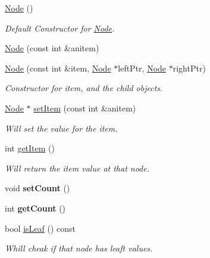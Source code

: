 \begin{DoxyCompactItemize}
\item 
\mbox{\label{class_node_ad7a34779cad45d997bfd6d3d8043c75f}} 
\mbox{\hyperlink{class_node_ad7a34779cad45d997bfd6d3d8043c75f}{Node}} ()
\begin{DoxyCompactList}\small\item\em Default Constructor for \mbox{\hyperlink{class_node}{Node}}. \end{DoxyCompactList}\item 
\mbox{\hyperlink{class_node_a6b85d29b3bde0f983d0a6135ca440c0a}{Node}} (const int \&anitem)
\item 
\mbox{\hyperlink{class_node_a63f4f5083e2a677525a28a5cd194178d}{Node}} (const int \&item, \mbox{\hyperlink{class_node}{Node}} $\ast$left\+Ptr, \mbox{\hyperlink{class_node}{Node}} $\ast$right\+Ptr)
\begin{DoxyCompactList}\small\item\em Constructor for item, and the child objects. \end{DoxyCompactList}\item 
\mbox{\hyperlink{class_node}{Node}} $\ast$ \mbox{\hyperlink{class_node_a2ee7aacc0b20abf2301256fe72d0d9cc}{set\+Item}} (const int \&anitem)
\begin{DoxyCompactList}\small\item\em Will set the value for the item. \end{DoxyCompactList}\item 
int \mbox{\hyperlink{class_node_ad51c74ff8860a12738136be8f1f17682}{get\+Item}} ()
\begin{DoxyCompactList}\small\item\em Will return the item value at that node. \end{DoxyCompactList}\item 
\mbox{\label{class_node_aa4852cb11b6fc5fbb03e110390d0966d}} 
void {\bfseries set\+Count} ()
\item 
\mbox{\label{class_node_a7fa9c0a066de25a23670691f6ca99116}} 
int {\bfseries get\+Count} ()
\item 
bool \mbox{\hyperlink{class_node_a0c5b662d3bfbb856292a9aab878ed622}{is\+Leaf}} () const
\begin{DoxyCompactList}\small\item\em Whill cheak if that node has leaft values. \end{DoxyCompactList}\item 

\end{DoxyCompactItemize}
